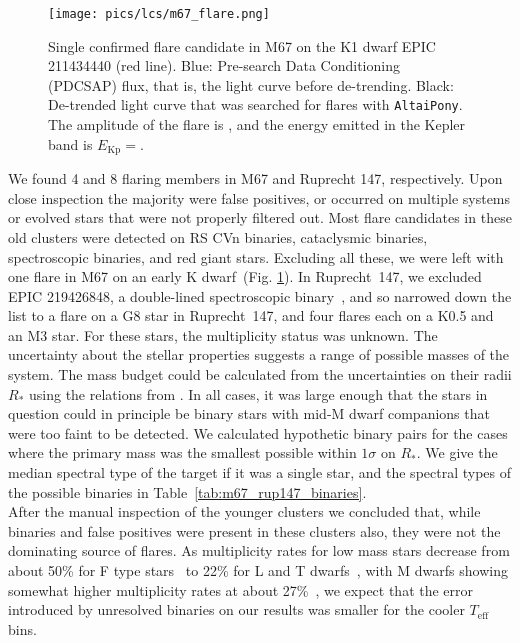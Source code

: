 \documentclass{aa}
\begin{document}
\begin{figure}[ht!]
    \centering
    \texttt{[image: pics/lcs/m67\_flare.png]}
    \caption{Single confirmed flare candidate in M67 on the K1 dwarf EPIC 211434440 (red line). Blue: Pre-search Data Conditioning (PDCSAP) flux, that is, the light curve before  de-trending. Black: De-trended light curve that was searched for flares with \texttt{AltaiPony}. The amplitude of the flare is \unskip, and the energy emitted in the Kepler band is $E_\mathrm{Kp}=$.}      
    \label{fig:m67}
\end{figure}
We found 4 and 8 flaring members in M67 and Ruprecht 147, respectively. Upon close inspection the majority were false positives, or occurred on multiple systems or evolved stars that were not properly filtered out. Most flare candidates in these old clusters were detected on RS CVn binaries, cataclysmic binaries, spectroscopic binaries, and red giant stars. Excluding all these, we were left with one flare in M67 on an early K dwarf~(Fig. \ref{fig:m67}). In Ruprecht~147, we excluded EPIC 219426848, a double-lined spectroscopic binary~\citep{curtis2013}, and so narrowed down the list to a flare on a G8 star in Ruprecht~147, and four flares each on a K0.5 and an M3 star. For these stars, the multiplicity status was unknown. The uncertainty about the stellar properties suggests a range of possible masses of the system. The mass budget could be calculated from the uncertainties on their radii $R_*$ using the relations from \citet{eker2018}. In all cases, it was large enough that the stars in question could in principle be binary stars with mid-M dwarf companions that were too faint to be detected. We calculated hypothetic binary pairs for the cases where the primary mass was the smallest possible within $1\sigma$ on $R_*$. We give the median spectral type of the target if it was a single star, and the spectral types of the possible binaries in Table~\ref{tab:m67_rup147_binaries}.
\\
After the manual inspection of the younger clusters we concluded that, while binaries and false positives were present in these clusters also, they were not the dominating source of flares. As multiplicity rates for low mass stars decrease from about 50\% for F type stars~\citep{raghavan2010} to 22\% for L and T dwarfs~\citep{duchene2013}, with M dwarfs showing somewhat higher multiplicity rates at about 27\%~\citep{winters2019}, we expect that the error introduced by unresolved binaries on our results was smaller for the cooler $T_\mathrm{eff}$ bins.
\end{document}
